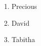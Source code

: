 \documentclass{article}
\begin{document}
	\begin{enumerate}
		\item Precious 
		\item David
		\item Tabitha 
	\end{enumerate}
\end{document}

